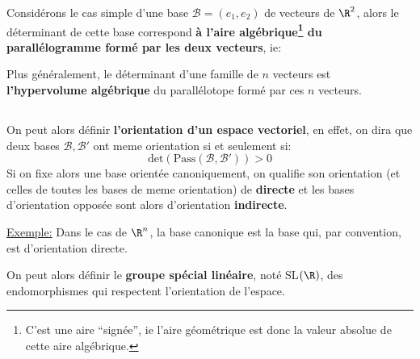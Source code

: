 Considérons le cas simple d'une base \(\mathscr{B} = (e_1, e_2)\) de vecteurs de \(\R^2\), alors le déterminant de cette base correspond \textbf{à l'aire algébrique\footnote[2]{C'est une aire ``signée'', ie l'aire géométrique est donc la valeur absolue de cette aire algébrique.} du parallélogramme formé par les deux vecteurs}, ie:
\begin{center}
\end{center}
Plus généralement, le déterminant d'une famille de \(n\) vecteurs est \textbf{l'hypervolume algébrique} du parallélotope formé par ces \(n\) vecteurs.\<

\subsection*{}
On peut alors définir \textbf{l'orientation d'un espace vectoriel}, en effet, on dira que deux bases \(\mathscr{B}, \mathscr{B'}\) ont meme orientation si et seulement si:
\[
   \text{det}(\text{Pass}(\mathscr{B}, \mathscr{B'})) > 0
\]
Si on fixe alors une base orientée canoniquement, on qualifie son orientation (et celles de toutes les bases de meme orientation) de \textbf{directe} et les bases d'orientation opposée sont alors d'orientation \textbf{indirecte}.\<

\underline{Exemple:} Dans le cas de \(\R^n\), la base canonique est la base qui, par convention, est d'orientation directe.\<

On peut alors définir le \textbf{groupe spécial linéaire}, noté SL\((\R)\), des endomorphismes qui respectent l'orientation de l'espace.
